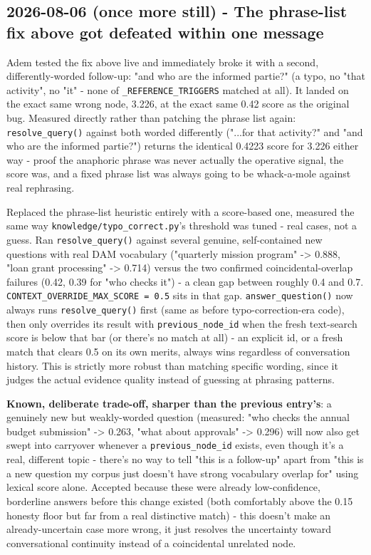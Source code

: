 \subsection*{2026-08-06 (once more still) - The phrase-list fix above got defeated within one message}
Adem tested the fix above live and immediately broke it with a second, differently-worded follow-up: "and who are the informed partie?" (a typo, no "that activity", no "it" - none of \texttt{\_\allowbreak{}REFERENCE\_\allowbreak{}TRIGGERS} matched at all). It landed on the exact same wrong node, 3.226, at the exact same 0.42 score as the original bug. Measured directly rather than patching the phrase list again: \texttt{resolve\_\allowbreak{}query()} against both worded differently ("...for that activity?" and "and who are the informed partie?") returns the identical 0.4223 score for 3.226 either way - proof the anaphoric phrase was never actually the operative signal, the score was, and a fixed phrase list was always going to be whack-a-mole against real rephrasing.

Replaced the phrase-list heuristic entirely with a score-based one, measured the same way \texttt{knowledge/\allowbreak{}typo\_\allowbreak{}correct.py}'s threshold was tuned - real cases, not a guess. Ran \texttt{resolve\_\allowbreak{}query()} against several genuine, self-contained new questions with real DAM vocabulary ("quarterly mission program" -> 0.888, "loan grant processing" -> 0.714) versus the two confirmed coincidental-overlap failures (0.42, 0.39 for "who checks it") - a clean gap between roughly 0.4 and 0.7. \texttt{CONTEXT\_\allowbreak{}OVERRIDE\_\allowbreak{}MAX\_\allowbreak{}SCORE = 0.5} sits in that gap. \texttt{answer\_\allowbreak{}question()} now always runs \texttt{resolve\_\allowbreak{}query()} first (same as before typo-correction-era code), then only overrides its result with \texttt{previous\_\allowbreak{}node\_\allowbreak{}id} when the fresh text-search score is below that bar (or there's no match at all) - an explicit id, or a fresh match that clears 0.5 on its own merits, always wins regardless of conversation history. This is strictly more robust than matching specific wording, since it judges the actual evidence quality instead of guessing at phrasing patterns.

\textbf{Known, deliberate trade-off, sharper than the previous entry's}: a genuinely new but weakly-worded question (measured: "who checks the annual budget submission" -> 0.263, "what about approvals" -> 0.296) will now also get swept into carryover whenever a \texttt{previous\_\allowbreak{}node\_\allowbreak{}id} exists, even though it's a real, different topic - there's no way to tell "this is a follow-up" apart from "this is a new question my corpus just doesn't have strong vocabulary overlap for" using lexical score alone. Accepted because these were already low-confidence, borderline answers before this change existed (both comfortably above the 0.15 honesty floor but far from a real distinctive match) - this doesn't make an already-uncertain case more wrong, it just resolves the uncertainty toward conversational continuity instead of a coincidental unrelated node.

